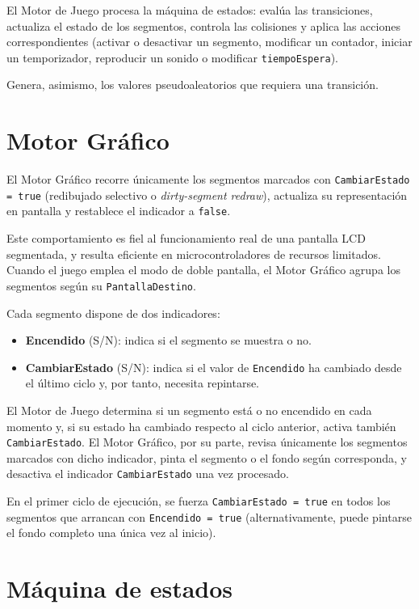 \documentclass[../main.tex]{subfiles}
\begin{document}
	El Motor de Juego procesa la máquina de estados: evalúa las transiciones, actualiza el estado de los segmentos, controla las colisiones y aplica las acciones correspondientes (activar o desactivar un segmento, modificar un contador, iniciar un temporizador, reproducir un sonido o modificar \texttt{tiempoEspera}).

	Genera, asimismo, los valores pseudoaleatorios que requiera una transición.

	\section{Motor Gráfico}
	\label{sec:motor-grafico}

	El Motor Gráfico recorre únicamente los segmentos marcados con \texttt{CambiarEstado = true} (redibujado selectivo o \textit{dirty-segment redraw}), actualiza su representación en pantalla y restablece el indicador a \texttt{false}.

	Este comportamiento es fiel al funcionamiento real de una pantalla LCD segmentada, y resulta eficiente en microcontroladores de recursos limitados. Cuando el juego emplea el modo de doble pantalla, el Motor Gráfico agrupa los segmentos según su \texttt{PantallaDestino}.

	Cada segmento dispone de dos indicadores:
	\begin{itemize}
		\item \textbf{Encendido} (S/N): indica si el segmento se muestra o no.
		\item \textbf{CambiarEstado} (S/N): indica si el valor de \texttt{Encendido} ha cambiado desde el último ciclo y, por tanto, necesita repintarse.
	\end{itemize}

	El Motor de Juego determina si un segmento está o no encendido en cada momento y, si su estado ha cambiado respecto al ciclo anterior, activa también \texttt{CambiarEstado}. El Motor Gráfico, por su parte, revisa únicamente los segmentos marcados con dicho indicador, pinta el segmento o el fondo según corresponda, y desactiva el indicador \texttt{CambiarEstado} una vez procesado.

	En el primer ciclo de ejecución, se fuerza \texttt{CambiarEstado = true} en todos los segmentos que arrancan con \texttt{Encendido = true} (alternativamente, puede pintarse el fondo completo una única vez al inicio).

	\section{Máquina de estados}
	\label{sec:maquina-estados}
\end{document}
